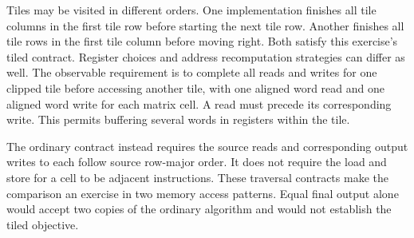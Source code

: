 Tiles may be visited in different orders. One implementation finishes all tile
columns in the first tile row before starting the next tile row. Another finishes
all tile rows in the first tile column before moving right. Both satisfy this
exercise's tiled contract. Register choices and address recomputation strategies
can differ as well. The observable requirement is to complete all reads and
writes for one clipped tile before accessing another tile, with one aligned
word read and one aligned word write for each matrix cell. A read must precede
its corresponding write. This permits buffering several words in registers
within the tile.

The ordinary contract instead requires the source reads and corresponding output
writes to each follow source row-major order. It does not require the load and
store for a cell to be adjacent instructions. These traversal contracts make
the comparison an exercise in two memory access patterns. Equal final output
alone would accept two copies of the ordinary algorithm and would not establish
the tiled objective.
